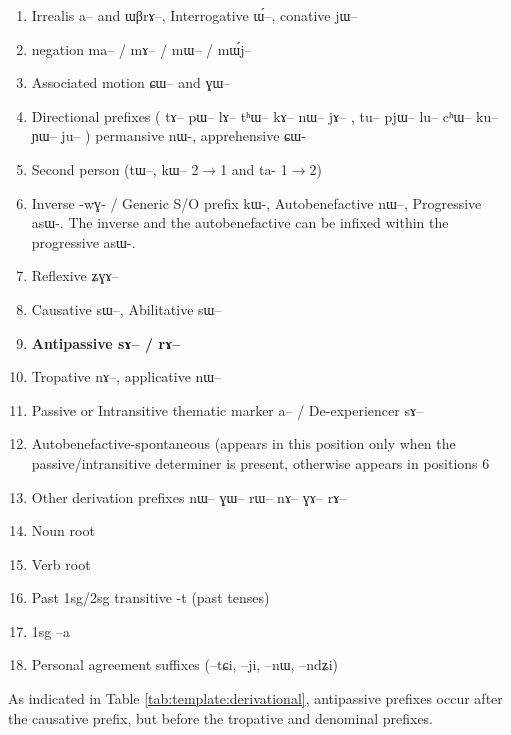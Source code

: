 \documentclass[oldfontcommands,oneside,a4paper,11pt]{article}
\newcommand{\ipa}[1]{{\phon \mbox{#1}}} %
\begin{document}
\begin{landscape}
\begin{multicols}{2}
\begin{enumerate}
\item Irrealis  \ipa{a}-- and \ipa{ɯβrɤ}--, Interrogative \ipa{ɯ́}--, conative \ipa{jɯ}--
\item negation \ipa{ma}-- / \ipa{mɤ}-- / \ipa{mɯ}-- / \ipa{mɯ́j}--
\item Associated motion \ipa{ɕɯ}-- and \ipa{ɣɯ}--
\item Directional prefixes ( \ipa{tɤ}--  \ipa{pɯ}--  \ipa{lɤ}--   \ipa{tʰɯ}--  \ipa{kɤ}--   \ipa{nɯ}--   \ipa{jɤ}-- ,  \ipa{tu}--   \ipa{pjɯ}--   \ipa{lu}--   \ipa{cʰɯ}--   \ipa{ku}--   \ipa{ɲɯ}--   \ipa{ju}-- ) permansive  \ipa{nɯ}-, apprehensive \ipa{ɕɯ}-
\item Second person (\ipa{tɯ}--, \ipa{kɯ}-- 2$\rightarrow$1 and ta- 1$\rightarrow$2)
\item Inverse -\ipa{wɣ}- / Generic S/O prefix \ipa{kɯ}-, Autobenefactive \ipa{nɯ--}, Progressive \ipa{asɯ}-. The inverse and the autobenefactive can be infixed within the progressive \ipa{asɯ}-.
\item Reflexive \ipa{ʑɣɤ}-- 
\item Causative \ipa{sɯ}--, Abilitative \ipa{sɯ}--
\item \textbf{ Antipassive  \ipa{sɤ}-- / \ipa{rɤ}--}
\item  Tropative \ipa{nɤ}--, applicative \ipa{nɯ}--
\item Passive or Intransitive thematic marker \ipa{a}-- / De-experiencer \ipa{sɤ}--
\item Autobenefactive-spontaneous (appears in this position only when the passive/intransitive determiner is present, otherwise appears in positions 6 
\item Other derivation prefixes \ipa{nɯ}-- \ipa{ɣɯ}-- \ipa{rɯ}-- \ipa{nɤ}-- \ipa{ɣɤ}-- \ipa{rɤ}--
\item Noun root
\item Verb root 
\item Past 1sg/2sg transitive -\ipa{t} (past tenses)
\item 1sg --\ipa{a}
\item Personal agreement suffixes (--\ipa{tɕi}, --\ipa{ji}, --\ipa{nɯ}, --\ipa{ndʑi})
\end{enumerate}


\end{multicols}
  \end{landscape}


As indicated in Table \ref{tab:template:derivational}, antipassive prefixes occur after the causative prefix, but before the tropative and denominal prefixes.
\end{document}
